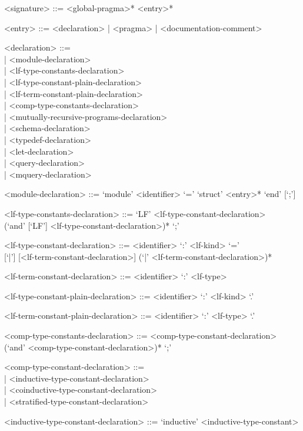 \documentclass[11pt]{article}
\begin{document}
\begin{grammar}
<signature> ::= <global-pragma>* <entry>*

<entry> ::= <declaration> | <pragma> | <documentation-comment>

<declaration> ::= \hfill\\
| <module-declaration>\\
| <lf-type-constants-declaration>\\
| <lf-type-constant-plain-declaration>\\
| <lf-term-constant-plain-declaration>\\
| <comp-type-constants-declaration>\\
| <mutually-recursive-programs-declaration>\\
| <schema-declaration>\\
| <typedef-declaration>\\
| <let-declaration>\\
| <query-declaration>\\
| <mquery-declaration>

<module-declaration> ::= `module' <identifier> `=' `struct' <entry>* `end' [`;']

<lf-type-constants-declaration> ::= `LF' <lf-type-constant-declaration>\\
(`and' [`LF'] <lf-type-constant-declaration>)* `;'

<lf-type-constant-declaration> ::= <identifier> `:' <lf-kind> `='\\{}
[`|'] [<lf-term-constant-declaration>] (`|' <lf-term-constant-declaration>)*

<lf-term-constant-declaration> ::= <identifier> `:' <lf-type>

<lf-type-constant-plain-declaration> ::= <identifier> `:' <lf-kind> `.'

<lf-term-constant-plain-declaration> ::= <identifier> `:' <lf-type> `.'

<comp-type-constants-declaration> ::= <comp-type-constant-declaration>\\
(`and' <comp-type-constant-declaration>)* `;'

<comp-type-constant-declaration> ::= \hfill\\
| <inductive-type-constant-declaration>\\
| <coinductive-type-constant-declaration>\\
| <stratified-type-constant-declaration>

<inductive-type-constant-declaration> ::= `inductive' <inductive-type-constant>


\end{grammar}
\end{document}
